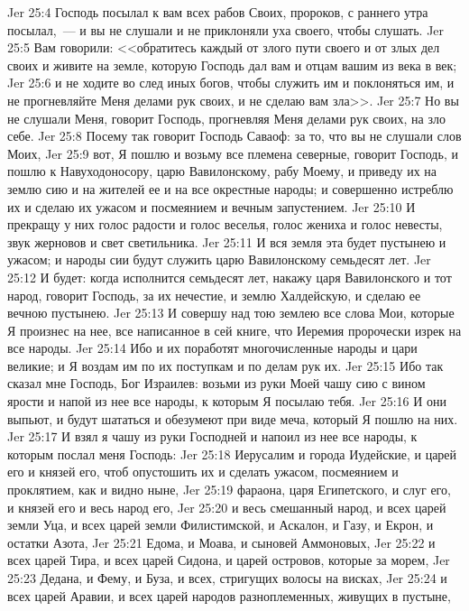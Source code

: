 \vs Jer 25:4 Господь посылал к вам всех рабов Своих, пророков, с раннего утра посылал,~--- и вы не слушали и не приклоняли уха своего, чтобы слушать.
\vs Jer 25:5 Вам говорили: <<обратитесь каждый от злого пути своего и от злых дел своих и живите на земле, которую Господь дал вам и отцам вашим из века в век;
\vs Jer 25:6 и не ходите во след иных богов, чтобы служить им и поклоняться им, и не прогневляйте Меня делами рук своих, и не сделаю вам зла>>.
\vs Jer 25:7 Но вы не слушали Меня, говорит Господь, прогневляя Меня делами рук своих, на зло себе.
\vs Jer 25:8 Посему так говорит Господь Саваоф: за то, что вы не слушали слов Моих,
\vs Jer 25:9 вот, Я пошлю и возьму все племена северные, говорит Господь, и пошлю к Навуходоносору, царю Вавилонскому, рабу Моему, и приведу их на землю сию и на жителей ее и на все окрестные народы; и совершенно истреблю их и сделаю их ужасом и посмеянием и вечным запустением.
\vs Jer 25:10 И прекращу у них голос радости и голос веселья, голос жениха и голос невесты, звук жерновов и свет светильника.
\vs Jer 25:11 И вся земля эта будет пустынею и ужасом; и народы сии будут служить царю Вавилонскому семьдесят лет.
\vs Jer 25:12 И будет: когда исполнится семьдесят лет, накажу царя Вавилонского и тот народ, говорит Господь, за их нечестие, и землю Халдейскую, и сделаю ее вечною пустынею.
\vs Jer 25:13 И совершу над тою землею все слова Мои, которые Я произнес на нее, все написанное в сей книге, что Иеремия пророчески изрек на все народы.
\vs Jer 25:14 Ибо и их поработят многочисленные народы и цари великие; и Я воздам им по их поступкам и по делам рук их.
\vs Jer 25:15 Ибо так сказал мне Господь, Бог Израилев: возьми из руки Моей чашу сию с вином ярости и напой из нее все народы, к которым Я посылаю тебя.
\vs Jer 25:16 И они выпьют, и будут шататься и обезумеют при виде меча, который Я пошлю на них.
\vs Jer 25:17 И взял я чашу из руки Господней и напоил из нее все народы, к которым послал меня Господь:
\vs Jer 25:18 Иерусалим и города Иудейские, и царей его и князей его, чтоб опустошить их и сделать ужасом, посмеянием и проклятием, как и видно ныне,
\vs Jer 25:19 фараона, царя Египетского, и слуг его, и князей его и весь народ его,
\vs Jer 25:20 и весь смешанный народ, и всех царей земли Уца, и всех царей земли Филистимской, и Аскалон, и Газу, и Екрон, и остатки Азота,
\vs Jer 25:21 Едома, и Моава, и сыновей Аммоновых,
\vs Jer 25:22 и всех царей Тира, и всех царей Сидона, и царей островов, которые за морем,
\vs Jer 25:23 Дедана, и Фему, и Буза, и всех, стригущих волосы на висках,
\vs Jer 25:24 и всех царей Аравии, и всех царей народов разноплеменных, живущих в пустыне,
